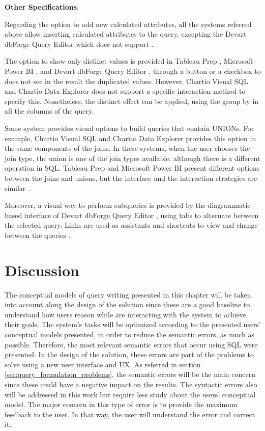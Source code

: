\textbf{Other Specifications}: 

Regarding the option to add new calculated attributes, all the systems referred above allow inserting calculated attributes to the query, excepting the Devart dbForge Query Editor which does not support \cite{visualSqlActions,tableauCalculatedField,powerBICommonQueryTasks}.

The option to show only distinct values is provided in Tableau Prep \cite{tableauPrep}, Microsoft Power BI \cite{powerBI}, and Devart dbForge Query Editor \cite{dbForgeQueryBuilder}, through a button or a checkbox to does not see in the result the duplicated values. However, Chartio Visual SQL \cite{chartioVisualSQL} and Chartio Data Explorer \cite{chartioDataExplorer} does not support a specific interaction method to specify this. Nonetheless, the distinct effect can be applied, using the group by in all the columns of the query.

Some system provides visual options to build queries that contain UNIONs. For example, Chartio Visual SQL \cite{chartioVisualSQL} and Chartio Data Explorer \cite{chartioDataExplorer} provides this option in the same components of the joins. In these systems, when the user chooses the join type, the union is one of the join types available, although there is a different operation in SQL. Tableau Prep \cite{tableauPrep} and Microsoft Power BI \cite{powerBI} present different options between the joins and unions, but the interface and the interaction strategies are similar \cite{tableauAggregateJoinOrUnionData,powerBIShapeAndCombineData}.

Moreover, a visual way to perform subqueries is provided by the diagrammatic-based interface of Devart dbForge Query Editor \cite{dbForgeQueryBuilder}, using tabs to alternate between the selected query. Links are used as assistants and shortcuts to view and change between the queries \cite{dbForgeSubqueriesOverview,dbForgeSubqueriesInFromClauses}.

\section{Discussion}
\label{sec:discussion}
The conceptual models of query writing presented in this chapter will be taken into account along the design of the solution since these are a good baseline to understand how users reason while are interacting with the system to achieve their goals. The system's tasks will be optimized according to the presented users' conceptual models presented, in order to reduce the semantic errors, as much as possible. Therefore, the most relevant semantic errors that occur using SQL were presented. In the design of the solution, these errors are part of the problems to solve using a new user interface and \gls{UX}. As referred in section \ref{sec:query_formulation_problems}, the semantic errors will be the main concern since these could have a negative impact on the results. The syntactic errors also will be addressed in this work but require less study about the users’ conceptual model. The major concern in this type of error is to provide the maximum feedback to the user. In that way, the user will understand the error and correct it.

